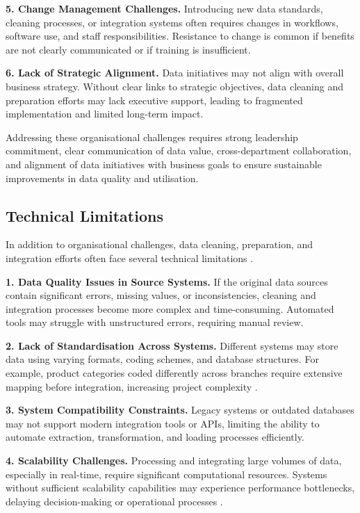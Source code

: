 \textbf{5. Change Management Challenges.}  
Introducing new data standards, cleaning processes, or integration systems often requires changes in workflows, software use, and staff responsibilities. Resistance to change is common if benefits are not clearly communicated or if training is insufficient.

\textbf{6. Lack of Strategic Alignment.}  
Data initiatives may not align with overall business strategy. Without clear links to strategic objectives, data cleaning and preparation efforts may lack executive support, leading to fragmented implementation and limited long-term impact.

Addressing these organisational challenges requires strong leadership commitment, clear communication of data value, cross-department collaboration, and alignment of data initiatives with business goals to ensure sustainable improvements in data quality and utilisation.

\subsection{Technical Limitations}

In addition to organisational challenges, data cleaning, preparation, and integration efforts often face several technical limitations \cite{schellhase2007data}.

\textbf{1. Data Quality Issues in Source Systems.}  
If the original data sources contain significant errors, missing values, or inconsistencies, cleaning and integration processes become more complex and time-consuming. Automated tools may struggle with unstructured errors, requiring manual review.

\textbf{2. Lack of Standardisation Across Systems.}  
Different systems may store data using varying formats, coding schemes, and database structures. For example, product categories coded differently across branches require extensive mapping before integration, increasing project complexity \cite{batini2009methodologies}.

\textbf{3. System Compatibility Constraints.}  
Legacy systems or outdated databases may not support modern integration tools or APIs, limiting the ability to automate extraction, transformation, and loading processes efficiently.

\textbf{4. Scalability Challenges.}  
Processing and integrating large volumes of data, especially in real-time, require significant computational resources. Systems without sufficient scalability capabilities may experience performance bottlenecks, delaying decision-making or operational processes \cite{stonebraker2010sql}.

